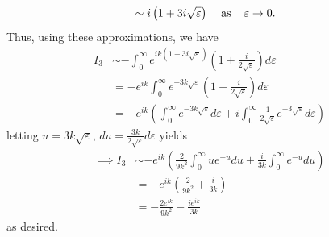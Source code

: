 \documentclass{article}
\begin{document}
\begin{itemize}
\begin{align*}
        &\sim i\left(1 + 3i\sqrt{\varepsilon}\right) \hspace{0.4cm} \text{as} \hspace{0.4cm} \varepsilon \to 0.
    \end{align*}
    Thus, using these approximations, we have
    \begin{align*}
        I_3 &\sim -\int_0^{\infty}e^{ik(1 + 3i\sqrt{\varepsilon})}\left(1 + \frac{i}{2\sqrt{\varepsilon}}\right)d\varepsilon\\
        &= -e^{ik}\int_0^{\infty}e^{-3k\sqrt{\varepsilon}}\left(1 + \frac{i}{2\sqrt{\varepsilon}}\right)d\varepsilon\\
        &= -e^{ik}\left(\int_0^{\infty} e^{-3k\sqrt{\varepsilon}}d\varepsilon + i\int_0^{\infty}\frac{1}{2\sqrt{\varepsilon}}e^{-3\sqrt{\varepsilon}}d\varepsilon\right)
    \end{align*}
    letting $u = 3k\sqrt{\varepsilon}$, $du = \frac{3k}{2\sqrt{\varepsilon}}d\varepsilon$ yields
    \begin{align*}
        \implies I_3 &\sim -e^{ik}\left(\frac{2}{9k^2}\int_0^{\infty}ue^{-u}du + \frac{i}{3k}\int_0^{\infty}e^{-u}du\right)\\
        &= -e^{ik}\left(\frac{2}{9k^2} + \frac{i}{3k}\right)\\
        &= -\frac{2e^{ik}}{9k^2} - \frac{ie^{ik}}{3k}
    \end{align*}
    as desired.
    
\end{itemize}
\end{document}
